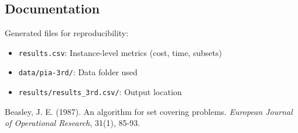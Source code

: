 \documentclass[12pt]{article}
\begin{document}
\subsection{Documentation}
Generated files for reproducibility:

\begin{itemize}
    \item \texttt{results.csv}: Instance-level metrics (cost, time, subsets)
    \item \texttt{data/pia-3rd/}: Data folder used
    \item \texttt{results/results\_3rd.csv/}: Output location
\end{itemize}

\begin{thebibliography}{9}
Beasley, J. E. (1987). An algorithm for set covering problems. \textit{European Journal of Operational Research}, 31(1), 85-93.
\end{thebibliography}
\end{document}
